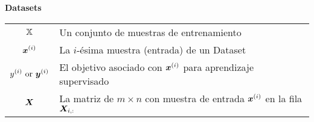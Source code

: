 \vspace{\notationgap}
\begin{minipage}{\textwidth}
\centerline{\bf Datasets}
\bgroup
\def\arraystretch{1.5}
\begin{tabular}{cp{}}
$\displaystyle {\mathbb{X}}$ & Un conjunto de muestras de entrenamiento\\
$\displaystyle {\bm{x}}^{(i)}$ & La $i$-\'esima muestra (entrada) de un Dataset\\
$\displaystyle y^{(i)}\text{ or }{\bm{y}}^{(i)}$ & El objetivo asociado con ${\bm{x}}^{(i)}$ para aprendizaje supervisado\\
$\displaystyle {\bm{X}}$ & La matriz de $m \times n$ con muestra de entrada ${\bm{x}}^{(i)}$ en la fila ${\bm{X}}_{i,:}$\\
\end{tabular}
\egroup
\end{minipage}

\clearpage
